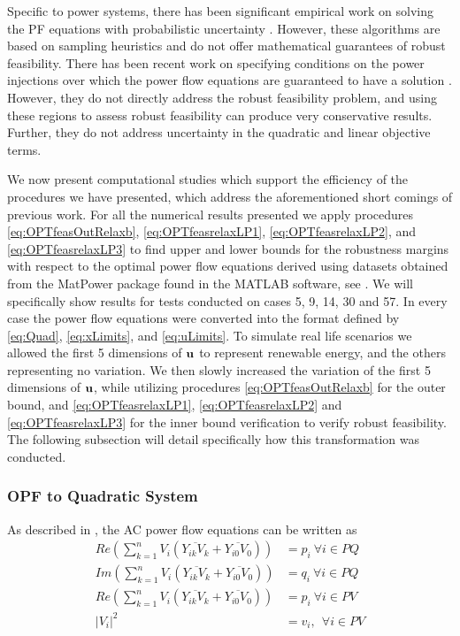 Specific to power systems, there has been significant empirical work on solving the PF equations with probabilistic uncertainty \cite{morales2007point,wang1992interval}.
However, these algorithms are based on sampling heuristics and do not offer mathematical guarantees of robust feasibility.
There has been recent work on specifying conditions on the power injections over which the power flow equations are guaranteed to have a solution \cite{bolognani2016existence,EPFLA,EPFLB}.
However, they do not directly address the robust feasibility problem, and using these regions to assess robust feasibility can produce very conservative results.
Further, they do not address uncertainty in the quadratic and linear objective terms.

We now present computational studies which support the efficiency of the procedures we have presented, which address the aforementioned short comings of previous work. 
For all the numerical results presented we apply procedures \eqref{eq:OPTfeasOutRelaxb}, \eqref{eq:OPTfeasrelaxLP1}, \eqref{eq:OPTfeasrelaxLP2}, and \eqref{eq:OPTfeasrelaxLP3} to find upper and lower bounds for the robustness margins with respect to the optimal power flow equations derived using datasets obtained from the MatPower package found in the MATLAB software, see \cite{matpower}. 
We will specifically show results for tests conducted on cases 5, 9, 14, 30 and 57. 
In every case the power flow equations were converted into the format defined by \eqref{eq:Quad}, \eqref{eq:xLimits}, and \eqref{eq:uLimits}. 
To simulate real life scenarios we allowed the first 5 dimensions of $\mathbf{u}$ to represent renewable energy, and the others representing no variation. We then slowly increased the variation of the first 5 dimensions of $\mathbf{u}$, while utilizing procedures \eqref{eq:OPTfeasOutRelaxb} for the outer bound, and \eqref{eq:OPTfeasrelaxLP1}, \eqref{eq:OPTfeasrelaxLP2} and \eqref{eq:OPTfeasrelaxLP3} for the inner bound verification to verify robust feasibility. 
The following subsection will detail specifically how this transformation was conducted.

\subsubsection{OPF to Quadratic System}
As described in \cite{DjTuritsyn}, the AC power flow equations can be written as 
\begin{equation}\label{eq:Real1}
	\begin{array}{rl}
	Re\left(\sum\limits_{k=1}^n V_i\left(\overline{Y_{ik}V_k} + \overline{Y_{i0}V_0}\right)\right) &= p_i \ \forall i\in PQ \\
	
	Im\left(\sum\limits_{k=1}^n V_i\left(\overline{Y_{ik}V_k} + \overline{Y_{i0}V_0}\right)\right) &= q_i \ \forall i\in PQ \\
	
	Re\left(\sum\limits_{k=1}^n V_i\left(\overline{Y_{ik}V_k} + \overline{Y_{i0}V_0}\right)\right) &= p_i \ \forall i\in PV \\ 
	
	|V_i|^2 &= v_i, \  \ \forall i \in PV 
	\end{array}
\end{equation}

